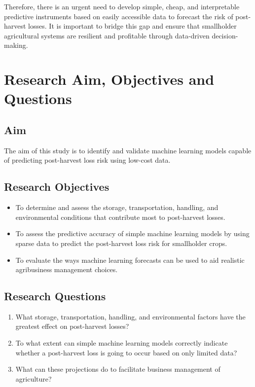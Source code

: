 Therefore, there is an urgent need to develop simple, cheap, and interpretable predictive
instruments based on easily accessible data to forecast the risk of post-harvest losses. It is
important to bridge this gap and ensure that smallholder agricultural systems are resilient and
profitable through data-driven decision-making.


\section{Research Aim, Objectives and Questions}

\subsection{Aim}

The aim of this study is to identify and validate machine learning models capable of predicting
post-harvest loss risk using low-cost data.

\subsection{Research Objectives}

\begin{itemize}
    \item To determine and assess the storage, transportation, handling, and environmental
          conditions that contribute most to post-harvest losses.
    \item To assess the predictive accuracy of simple machine learning models by using sparse
          data to predict the post-harvest loss risk for smallholder crops.
    \item To evaluate the ways machine learning forecasts can be used to aid realistic
          agribusiness management choices.
\end{itemize}

\subsection{Research Questions}

\begin{enumerate}
    \item What storage, transportation, handling, and environmental factors have the greatest
          effect on post-harvest losses?
    \item To what extent can simple machine learning models correctly indicate whether a
          post-harvest loss is going to occur based on only limited data?
    \item What can these projections do to facilitate business management of agriculture?
\end{enumerate}


